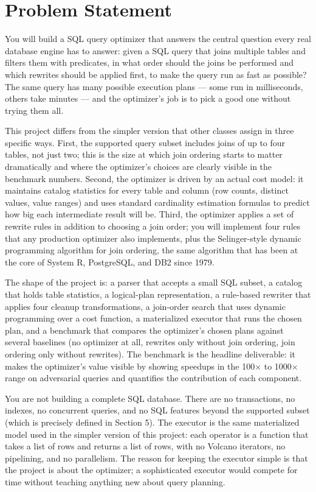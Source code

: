 \documentclass[11pt,a4paper]{article}
\begin{document}

\section{Problem Statement}

You will build a SQL query optimizer that answers the central question every real database engine has to answer: given a SQL query that joins multiple tables and filters them with predicates, in what order should the joins be performed and which rewrites should be applied first, to make the query run as fast as possible? The same query has many possible execution plans --- some run in milliseconds, others take minutes --- and the optimizer's job is to pick a good one without trying them all.

This project differs from the simpler version that other classes assign in three specific ways. First, the supported query subset includes joins of up to four tables, not just two; this is the size at which join ordering starts to matter dramatically and where the optimizer's choices are clearly visible in the benchmark numbers. Second, the optimizer is driven by an actual cost model: it maintains catalog statistics for every table and column (row counts, distinct values, value ranges) and uses standard cardinality estimation formulas to predict how big each intermediate result will be. Third, the optimizer applies a set of rewrite rules in addition to choosing a join order; you will implement four rules that any production optimizer also implements, plus the Selinger-style dynamic programming algorithm for join ordering, the same algorithm that has been at the core of System R, PostgreSQL, and DB2 since 1979.

The shape of the project is: a parser that accepts a small SQL subset, a catalog that holds table statistics, a logical-plan representation, a rule-based rewriter that applies four cleanup transformations, a join-order search that uses dynamic programming over a cost function, a materialized executor that runs the chosen plan, and a benchmark that compares the optimizer's chosen plans against several baselines (no optimizer at all, rewrites only without join ordering, join ordering only without rewrites). The benchmark is the headline deliverable: it makes the optimizer's value visible by showing speedups in the 100$\times$ to 1000$\times$ range on adversarial queries and quantifies the contribution of each component.

You are not building a complete SQL database. There are no transactions, no indexes, no concurrent queries, and no SQL features beyond the supported subset (which is precisely defined in Section 5). The executor is the same materialized model used in the simpler version of this project: each operator is a function that takes a list of rows and returns a list of rows, with no Volcano iterators, no pipelining, and no parallelism. The reason for keeping the executor simple is that the project is about the optimizer; a sophisticated executor would compete for time without teaching anything new about query planning.
\end{document}
